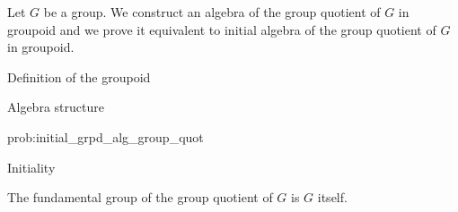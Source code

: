 Let $G$ be a group.  We construct an algebra of the group quotient of $G$ in
groupoid and we prove it equivalent to initial algebra of the group
quotient of $G$ in groupoid.

\begin{definition}
  Definition of the groupoid
\end{definition}

\begin{problem}
  \label{prob:initial_grpd_alg_group_quot}
  Algebra structure
\end{problem}

\begin{construction}{prob:initial_grpd_alg_group_quot}

\end{construction}

\begin{proposition}
  Initiality
\end{proposition}

\begin{corollary}
  The fundamental group of the group quotient of $G$ is $G$ itself.
\end{corollary}
